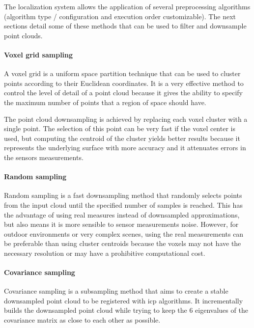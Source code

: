 The localization system allows the application of several preprocessing algorithms (algorithm type / configuration and execution order customizable). The next sections detail some of these methods that can be used to filter and downsample point clouds.


\paragraph{Voxel grid sampling}

A voxel grid is a uniform space partition technique that can be used to cluster points according to their Euclidean coordinates. It is a very effective method to control the level of detail of a point cloud because it gives the ability to specify the maximum number of points that a region of space should have.

The point cloud downsampling is achieved by replacing each voxel cluster with a single point. The selection of this point can be very fast if the voxel center is used, but computing the centroid of the cluster yields better results because it represents the underlying surface with more accuracy and it attenuates errors in the sensors measurements.


\paragraph{Random sampling}

Random sampling \cite{Vitter1984} is a fast downsampling method that randomly selects points from the input cloud until the specified number of samples is reached. This has the advantage of using real measures instead of downsampled approximations, but also means it is more sensible to sensor measurements noise. However, for outdoor environments or very complex scenes, using the real measurements can be preferable than using cluster centroids because the voxels may not have the necessary resolution or may have a prohibitive computational cost.


\paragraph{Covariance sampling}

Covariance sampling \cite{Gelfand} is a subsampling method that aims to create a stable downsampled point cloud to be registered with \gls{icp} algorithms. It incrementally builds the downsampled point cloud while trying to keep the 6 eigenvalues of the covariance matrix as close to each other as possible.

